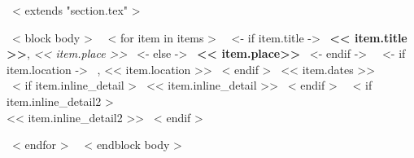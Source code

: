 ~< extends "section.tex" >~

~< block body >~
~< for item in items >~
    ~<- if item.title ->~
    \textbf{<< item.title >>}, \emph{<< item.place >>}
    ~<- else ->~
    \textbf{<< item.place>>}
    ~<- endif ->~
    ~<- if item.location ->~
    , << item.location >>
    ~< endif >~
    \hfill {\small \color{teal} << item.dates >>} \\[-1mm]
    ~< if item.inline_detail >~
    {\footnotesize \color{gray} << item.inline_detail >>}
    ~< endif >~
    ~< if item.inline_detail2 >~
    \\[-1mm]{\footnotesize \color{gray} << item.inline_detail2 >>}
    ~< endif >~
    \par \vspace{0.5mm}
~< endfor >~
\vspace{-0.3cm}
~< endblock body >~